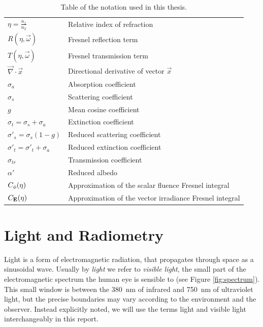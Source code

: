 \begin{table}[!ht]
\begin{tabular}{|l|l|}
$\eta = \frac{n_1}{n_2}$           & Relative index of refraction                            \\ %
$R(\eta,\vec{\omega})$             & Fresnel reflection term                                 \\ %
$T(\eta,\vec{\omega})$             & Fresnel transmission term                               \\ %
$\vec{\nabla} \cdot \vec{x}$       & Directional derivative of vector $\vec{x}$              \\ %
$\sigma_a$                         & Absorption coefficient                                  \\ %
$\sigma_s$                         & Scattering coefficient                                  \\ %
$g$                                & Mean cosine coefficient                                 \\ %
$\sigma_t = \sigma_s + \sigma_a$   & Extinction coefficient                                  \\ %
$\sigma'_s = \sigma_s (1-g)$       & Reduced scattering coefficient                          \\ %
$\sigma'_t = \sigma'_t + \sigma_a$ & Reduced extinction coefficient                          \\ %
$\sigma_{tr}$                      & Transmission coefficient                                \\ %
$\alpha'$                          & Reduced albedo                                          \\ %
$C_{\phi}(\eta)$                              & Approximation of the scalar fluence Fresnel integral    \\ %
$C_{\mathbf{E}}(\eta)$                              & Approximation of the vector irradiance Fresnel integral \\ \hline
\end{tabular}
\caption{Table of the notation used in this thesis.}
\end{table}
\FloatBarrier

\section{Light and Radiometry}
Light is a form of electromagnetic radiation, that propagates through space as a sinusoidal wave. Usually by \emph{light} we refer to \emph{visible light}, the small part of the electromagnetic spectrum the human eye is sensible to (see Figure \ref{fig:spectrum}). This small window is between the \SI{380}{\nano\meter} of infrared and \SI{750}{\nano\meter} of ultraviolet light, but the precise boundaries may vary according to the environment and the observer. Instead explicitly noted, we will use the terms light and visible light interchangeably in this report.

